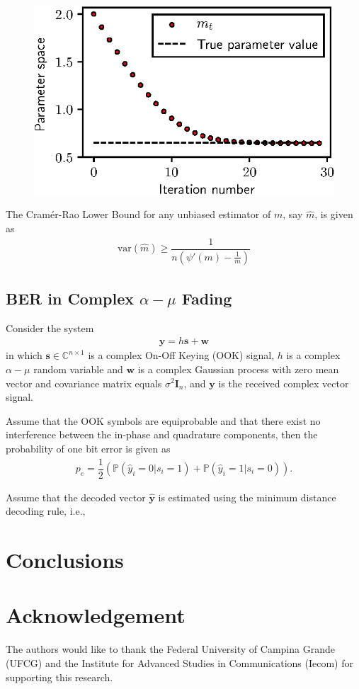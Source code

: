 \documentclass[conference, 10pt]{IEEEtran}
\begin{document}
\begin{figure}
    \centering
    \includegraphics{figures/mm.eps}
\end{figure}

The Cram\'er-Rao Lower Bound for any unbiased estimator of $m$, say $\hat{m}$, is given as~\cite{cheng2001}
\begin{align}
    \mathrm{var}(\hat{m}) \geq \dfrac{1}{n\left(\psi'(m) - \frac{1}{m}\right)}
\end{align}

\subsection{BER in Complex $\alpha-\mu$ Fading}

Consider the system
\begin{align}
    \bm{y} = h\bm{s} + \bm{w}
\end{align}
in which $\bm{s} \in \mathbb{C}^{n\times 1}$ is a complex On-Off Keying (OOK) signal,
$h$ is a complex $\alpha-\mu$ random variable and $\bm{w}$ is a complex Gaussian process
with zero mean vector and covariance matrix equals $\sigma^2\bm{I}_n$, and $\bm{y}$ is
the received complex vector signal.

Assume that the OOK symbols are equiprobable and that there exist no interference
between the in-phase and quadrature components, then the probability of one bit error
is given as
\begin{align}
    p_{e} = \dfrac{1}{2}\left(\mathbb{P}\left(\hat{y}_i = 0 | s_{i} = 1\right)
                            + \mathbb{P}\left(\hat{y}_i = 1 | s_{i} = 0\right)\right).
\end{align}

Assume that the decoded vector $\bm{\hat{y}}$ is estimated using the minimum distance decoding
rule, i.e.,

\section{Conclusions}

\section*{Acknowledgement}
The authors would like to thank the Federal University of Campina Grande (UFCG)
and the Institute for Advanced Studies in Communications (Iecom) for supporting
this research.



\end{document}
